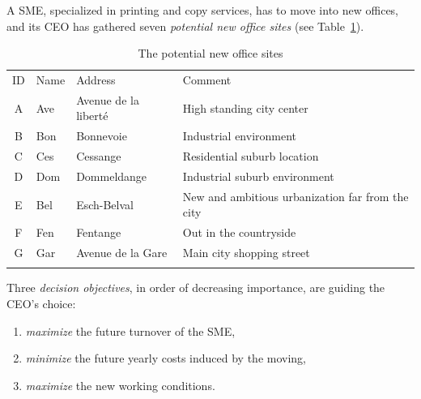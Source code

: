 A SME, specialized in printing and copy services, has to move into new offices, and its CEO has gathered seven \emph{potential new office sites} (see Table~\ref{tab:4.1}).
\begin{table}[h]
\caption{The potential new office sites}
\label{tab:4.1}       %
\begin{center}
    \begin{tabular}{c|l|l|l}
      \svhline\noalign{\smallskip}
      ID & Name & Address & Comment\\
      \noalign{\smallskip}\hline\noalign{\smallskip}
    A &   Ave  &  Avenue de la liberté &  High standing city center\\
    B &   Bon  &  Bonnevoie &             Industrial environment\\
    C &   Ces  &  Cessange &              Residential suburb location\\
    D &   Dom  &  Dommeldange &           Industrial suburb environment\\
    E &   Bel  &  Esch-Belval &           New and ambitious urbanization far from the city\\
    F &   Fen  &  Fentange &              Out in the countryside\\
      G &   Gar  &  Avenue de la Gare &     Main city shopping street\\
      \noalign{\smallskip}\hline
    \end{tabular}
\end{center}
\end{table}

Three \emph{decision objectives}, in order of decreasing importance, are guiding the CEO's choice:
\begin{enumerate}[leftmargin=1cm]
\item \emph{maximize} the future turnover of the SME,
\item \emph{minimize} the future yearly costs induced by the moving,
\item \emph{maximize} the new working conditions.
\end{enumerate}

